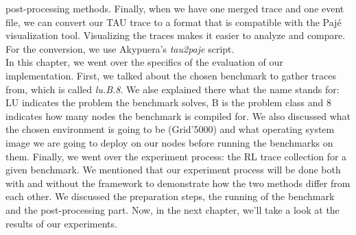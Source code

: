 post-processing methods. Finally, when we have one merged trace and
one event file, we can convert our TAU trace to a format that is
compatible with the Pajé\cite{cob00} visualization tool. Visualizing
the traces makes it easier to analyze and compare. For the conversion,
we use Akypuera's\cite{s13} \emph{tau2paje} script.\\[0.5cm]
In this chapter, we went over the specifics of the evaluation of our
implementation. First, we talked about the chosen benchmark to gather
traces from, which is called \emph{lu.B.8}. We alse explained there
what the name stands for: LU indicates the problem the benchmark
solves, B is the problem class and 8 indicates how many nodes the
benchmark is compiled for. We also discussed what the chosen
environment is going to be (Grid'5000) and what operating system image
we are going to deploy on our nodes before running the benchmarks on
them. Finally, we went over the experiment process: the RL trace
collection for a given benchmark. We mentioned that our experiment
process will be done both with and without the framework to
demonstrate how the two methods differ from each other. We discussed
the preparation steps, the running of the benchmark and the
post-processing part. Now, in the next chapter, we'll take a look at
the results of our experiments.

